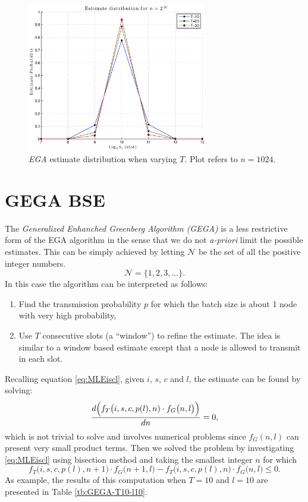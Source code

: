 \documentclass[11pt,a4paper,twoside,openright]{book}
\newcommand{\fg}{f_{G}}
\begin{document}
\begin{figure}[H]
\begin{center}
\includegraphics[width=0.7\textwidth]{matlab/Greenberg_MLE/greenberg-mle-fixed-n-varying-T}
\caption[\emph{EGA}: Estimate distribution when varying $T$.]{\emph{EGA} estimate distribution when varying $T$. Plot refers to $n=1024$.}
\label{fg:EGA-peaks-fixed-n-varing-T}
\end{center}
\end{figure}

\section{GEGA BSE}
\label{sc:GEGA BSE}
The  \emph{Generalized Enhanched Greenberg Algorithm (GEGA)} is a less restrictive form of the EGA algorithm in the sense that we do not \emph{a-priori} limit the possible estimates. This can be simply achieved by letting $\mathcal{N}$ be the set of all the positive integer numbers.
\begin{equation*}
\mathcal{N}=\{1,2,3,...\}.
\end{equation*}
In this case the algorithm can be interpreted as follows:
\begin{enumerate}
\item Find the transmission probability $p$ for which the batch size is about 1 node with very high probability,
\item Use $T$ consecutive slots (a ``window'') to refine the estimate. The idea is similar to a window based estimate except that a node is allowed to transmit in each slot.
\end{enumerate}

\noindent Recalling equation \eqref{eq:MLEiscl}, given $i$, $s$, $c$ and $l$, the estimate can be found by solving:
\begin{equation}
\frac{d\Bigl( f_{T}\bigl(i,s,c,p(l),n)\cdot \fg\bigl(n,l\bigr)\Bigr)}{dn}=0,
\end{equation}
which is not trivial to solve and involves numerical problems since $\fg(n,l)$ can present very small product terms. Then we solved the problem by investigating \eqref{eq:MLEiscl} using bisection method and taking the smallest integer $n$ for which
\begin{equation}
f_{T}\bigl(i,s,c,p(l),n+1)\cdot \fg\bigl(n+1,l\bigr)-f_{T}\bigl(i,s,c,p(l),n)\cdot \fg\bigl(n,l\bigr)\leq0.
\end{equation}
As example, the results of this computation when $T=10$ and $l=10$ are presented in Table \ref{tb:GEGA-T10-l10}.
\end{document}

